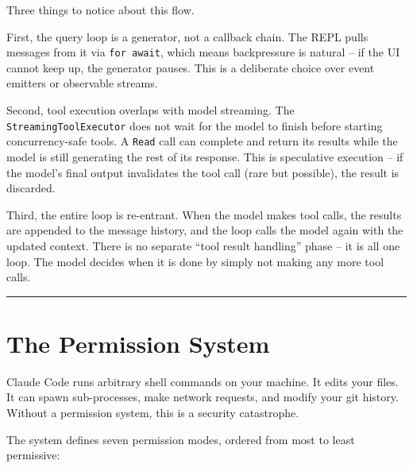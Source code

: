 \documentclass[
  english,
  11pt,
  letterpaper,
]{book}
\begin{document}
Three things to notice about this flow.

First, the query loop is a generator, not a callback chain. The REPL
pulls messages from it via \texttt{for\ await}, which means backpressure
is natural -- if the UI cannot keep up, the generator pauses. This is a
deliberate choice over event emitters or observable streams.

Second, tool execution overlaps with model streaming. The
\texttt{StreamingToolExecutor} does not wait for the model to finish
before starting concurrency-safe tools. A \texttt{Read} call can
complete and return its results while the model is still generating the
rest of its response. This is speculative execution -- if the model's
final output invalidates the tool call (rare but possible), the result
is discarded.

Third, the entire loop is re-entrant. When the model makes tool calls,
the results are appended to the message history, and the loop calls the
model again with the updated context. There is no separate ``tool result
handling'' phase -- it is all one loop. The model decides when it is
done by simply not making any more tool calls.

\begin{center}\rule{0.5\linewidth}{0.5pt}\end{center}

\section{The Permission System}\label{the-permission-system}

Claude Code runs arbitrary shell commands on your machine. It edits your
files. It can spawn sub-processes, make network requests, and modify
your git history. Without a permission system, this is a security
catastrophe.

The system defines seven permission modes, ordered from most to least
permissive:
\end{document}
